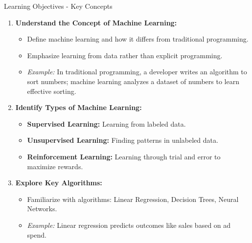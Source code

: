 \documentclass[aspectratio=169]{beamer}
\begin{document}
\begin{frame}[fragile]{Learning Objectives - Key Concepts}
    \begin{enumerate}
        \item \textbf{Understand the Concept of Machine Learning:}
        \begin{itemize}
            \item Define machine learning and how it differs from traditional programming.
            \item Emphasize learning from data rather than explicit programming.
            \item \textit{Example:} In traditional programming, a developer writes an algorithm to sort numbers; machine learning analyzes a dataset of numbers to learn effective sorting.
        \end{itemize}
        
        \item \textbf{Identify Types of Machine Learning:}
        \begin{itemize}
            \item \textbf{Supervised Learning:} Learning from labeled data.
            \item \textbf{Unsupervised Learning:} Finding patterns in unlabeled data.
            \item \textbf{Reinforcement Learning:} Learning through trial and error to maximize rewards.
        \end{itemize}
        
        \item \textbf{Explore Key Algorithms:}
        \begin{itemize}
            \item Familiarize with algorithms: Linear Regression, Decision Trees, Neural Networks.
            \item \textit{Example:} Linear regression predicts outcomes like sales based on ad spend.
        \end{itemize}
    \end{enumerate}
\end{frame}
\end{document}
